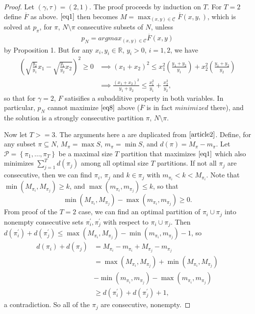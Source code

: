 \documentclass{article}
\theoremstyle{case}
\begin{document}
\begin{proof}
Let $\left( \gamma, \tau\right) = \left( 2,1\right)$. The proof proceeds by induction on $T$. For $T=2$ define $\overline{F}$ as above. $\ref{eq1}$ then becomes $M = \max_{\left( x,y\right) \in \underline{\mathcal{C}}} \overline{F}\left( x,y,\right)$, which is solved at $p_{\pi}$, for $\pi$, $N\setminus \pi$ consecutive subsets of $N$, unless 
\begin{align} \label{eq8}
p_N = argmax_{\left( x,y\right) \in \mathcal{C}} \overline{F}\left( x,y\right)
\end{align} by Proposition 1. But for any $x_i, y_i \in \mathbb{R}$, $y_i > 0$, $i = 1,2$, we have
\begin{align*}
\left( \sqrt{\frac{y_2}{y_1}}x_1 - \sqrt{\frac{y_1}{y_2}x_2}\right)^2 \geq 0 &\implies \left( x_1+x_2\right)^2 \leq x_1^2\left( \frac{y_1+y_2}{y_1}\right) + x_2^2\left( \frac{y_1+y_2}{y_2}\right)\\
&\implies \frac{\left( x_1+x_2\right)^2}{y_1+y_2} \leq \frac{x_1^2}{y_1} + \frac{x_2^2}{y_2},
\end{align*}
so that for $\gamma = 2$, $F$ satisifies a subadditive property in both variables. In particular, $p_N$ cannot maximize $\ref{eq8}$ above ($\overline{F}$ is in fact $\textit{minimized}$ there), and the solution is a strongly consecutive partition $\pi$, $N\setminus \pi$. 

Now let $T >= 3$. The arguments here a are duplicated from $\cite{article2}$. Define, for any subset $\pi \subseteq N$, $M_{\pi} = \max S$, $m_{\pi} = \min S$, and $d\left(\pi\right) = M_{\pi} - m_{\pi}$. Let $\mathcal{P} = \left\lbrace \pi_1, \dots, \pi_T\right\rbrace$ be a maximal size $T$ partition that maximizes $\ref{eq1}$ which also minimizes $\sum_{j=1}^T d\left(\pi_j\right)$ among all optimal size $T$ partitions. If not all $\pi_j$ are consecutive, then we can find $\pi_i$, $\pi_j$ and $k \in \pi_j$ with $m_{\pi_i} < k < M_{\pi_i}$. Note that $\min\left( M_{\pi_i}, M_{\pi_j}\right) \geq k$,  and $\max\left( m_{\pi_i}, m_{\pi_j} \right) \leq k$, so that 
\[
\min\left( M_{\pi_i}, M_{\pi_j}\right) - \max\left( m_{\pi_i}, m_{\pi_j} \right) \geq 0.
\] 
From proof of the $T = 2$ case, we can find an optimal partition of $\pi_i \cup \pi_j$ into nonempty consecutive sets $\pi^{\prime}_i, \pi^{\prime}_j$ with respect to $\pi_i \cup \pi_j$. Then $d\left( \pi^{\prime}_i\right) + d\left( \pi^{\prime}_j\right) \leq \max\left( M_{\pi_i}, M_{\pi_j}\right) - \min\left( m_{\pi_i}, m_{\pi_j}\right) - 1$, so
\begin{align*}
d\left(\pi_i\right) + d\left( \pi_j\right) &= M_{\pi_i} - m_{\pi_i} + M_{\pi_j} - m_{\pi_j} \\
&= \max\left(M_{\pi_i}, M_{\pi_j}\right) + \min\left(M_{\pi_i}, M_{\pi_j}\right) \\
&- \min\left( m_{\pi_i}, m_{\pi_j} \right) - \max\left( m_{\pi_i}, m_{\pi_j} \right) \\
&\geq d\left(\pi^{\prime}_i\right) + d\left(\pi^{\prime}_j\right) + 1,
\end{align*}
a contradiction. So all of the $\pi_j$ are consecutive, nonempty.


\end{proof}
\end{document}
